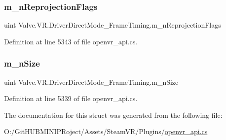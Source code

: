 \subsubsection{\texorpdfstring{m\_nReprojectionFlags}{m\_nReprojectionFlags}}
{\footnotesize\ttfamily uint Valve.\+V\+R.\+Driver\+Direct\+Mode\+\_\+\+Frame\+Timing.\+m\+\_\+n\+Reprojection\+Flags}



Definition at line 5343 of file openvr\+\_\+api.\+cs.

\mbox{\label{struct_valve_1_1_v_r_1_1_driver_direct_mode___frame_timing_a727c6323e027b0988e54fcd95c1403a3}} 
\subsubsection{\texorpdfstring{m\_nSize}{m\_nSize}}
{\footnotesize\ttfamily uint Valve.\+V\+R.\+Driver\+Direct\+Mode\+\_\+\+Frame\+Timing.\+m\+\_\+n\+Size}



Definition at line 5339 of file openvr\+\_\+api.\+cs.



The documentation for this struct was generated from the following file\+:\begin{DoxyCompactItemize}
\item 
O\+:/\+Git\+H\+U\+B\+M\+I\+N\+I\+P\+Roject/\+Assets/\+Steam\+V\+R/\+Plugins/\mbox{\hyperlink{openvr__api_8cs}{openvr\+\_\+api.\+cs}}\end{DoxyCompactItemize}
